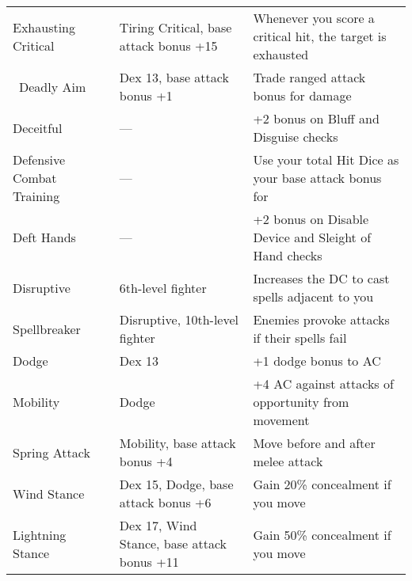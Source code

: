 \begin{table*}[]
\begin{tabularx}{\linewidth}{lXl}
\quad \quad Exhausting Critical & Tiring Critical, base attack bonus +15 & Whenever you score a critical hit, the target is exhausted\\\
Deadly Aim & Dex 13, base attack bonus +1 & Trade ranged attack bonus for damage\\
Deceitful & --- & +2 bonus on Bluff and Disguise checks\\
Defensive Combat Training & --- & Use your total Hit Dice as your base attack bonus for \\
Deft Hands & --- & +2 bonus on Disable Device and Sleight of Hand checks\\
Disruptive & 6th-level fighter & Increases the DC to cast spells adjacent to you\\
\quad Spellbreaker & Disruptive, 10th-level fighter & Enemies provoke attacks if their spells fail\\
Dodge & Dex 13 & +1 dodge bonus to AC\\
\quad Mobility & Dodge & +4 AC against attacks of opportunity from movement\\
\quad \quad Spring Attack & Mobility, base attack bonus +4 & Move before and after melee attack\\
\quad Wind Stance & Dex 15, Dodge, base attack bonus +6 & Gain 20\% concealment if you move\\
\quad \quad Lightning Stance & Dex 17, Wind Stance, base attack bonus +11 & Gain 50\% concealment if you move\\
\end{tabularx}
\end{table*}
